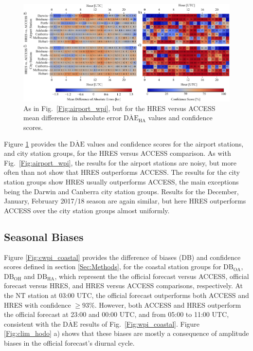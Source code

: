 \documentclass{ametsoc}
\begin{document}
\begin{figure}
\centering
\includegraphics[width=39pc]{airport_wpi_EA.pdf}
\caption{As in Fig.~\ref{Fig:airport_wpi}, but for the HRES versus ACCESS mean difference in absolute error $\overline{\text{DAE}}_\text{HA}$ values and confidence scores.
}
\label{Fig:airport_wpi_EA}
\end{figure}

Figure \ref{Fig:airport_wpi_EA} provides the $\overline{\text{DAE}}$ values and confidence scores for the airport stations, and city station groups, for the HRES versus ACCESS comparison. As with Fig.~\ref{Fig:airport_wpi}, the results for the airport stations are noisy, but more often than not show that HRES outperforms ACCESS. The results for the city station groups show HRES usually outperforms ACCESS, the main exceptions being the Darwin and Canberra city station groups. Results for the December, January, February 2017/18 season are again similar, but here HRES outperforms ACCESS over the city station groups almost uniformly. 

\subsection{Seasonal Biases}
\label{Sec:Seasonal}
Figure \ref{Fig:cwpi_coastal} provides the difference of biases (DB) and confidence scores defined in section \ref{Sec:Methods}, for the coastal station groups for $\text{DB}_\text{OA}$, $\text{DB}_\text{OH}$ and $\text{DB}_\text{HA}$, which represent the the official forecast versus ACCESS, official forecast versus HRES, and HRES versus ACCESS comparisons, respectively. At the NT station at 03:00 UTC, the official forecast outperforms both ACCESS and HRES with confidence $\geq 93\%$. However, both ACCESS and HRES outperform the official forecast at 23:00 and 00:00 UTC, and from 05:00 to 11:00 UTC, consistent with the $\overline{\text{DAE}}$ results of Fig.~\ref{Fig:wpi_coastal}. Figure \ref{Fig:clim_hodo} a) shows that these biases are mostly a consequence of amplitude biases in the official forecast's diurnal cycle.
\end{document}
